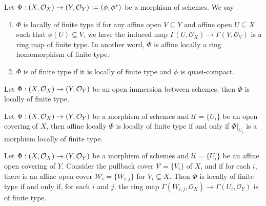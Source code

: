 \begin{definition}
Let $\Phi : \left(X, \mathcal{O}_{X}\right) \to \left(Y, \mathcal{O}_{Y}\right) := (\phi, \phi^*)$ be a morphism of schemes. We say
\begin{enumerate}
    \item $\Phi$ is locally of finite type if for any affine open $V \subseteq Y$ and affine open $U \subseteq X$ such that $\phi(U) \subseteq V$, we have the induced map $\Gamma(U, \mathscr{O}_X) \to \Gamma(V, \mathscr{O}_V)$ is a ring map of finite type. In another word, $\Phi$ is affine locally a ring homomorphism of finite type.
    \item $\Phi$ is of finite type if it is locally of finite type and $\phi$ is quasi-compact.
\end{enumerate}
\end{definition}

\begin{proposition}\label{thm:affine-locally-open-immersion}
  Let $\Phi : \left(X, \mathcal{O}_{X}\right) \to \left(Y, \mathcal{O}_{Y}\right)$ be an open immersion between schemes, then $\Phi$ is locally of finite type.
\end{proposition}

\begin{proposition}\label{thm:affine-locally-source-cover}
  Let $\Phi : \left(X, \mathcal{O}_{X}\right) \to \left(Y, \mathcal{O}_{Y}\right)$ be a morphism of schemes and $\mathscr{U} = \{U_{i}\}$ be an open covering of $X$, then affine locally $\Phi$ is locally of finite type if and only if $\Phi|_{U_i}$ is a morphism locally of finite type.
\end{proposition}

\begin{proposition}\label{thm:affine-cover-locally-of-finite-type}
  Let $\Phi : \left(X, \mathcal{O}_{X}\right) \to \left(Y, \mathcal{O}_{Y}\right)$ be a morphism of schemes and $\mathscr{U}=\{U_{i}\}$ be an affine open covering of $Y$. Consider the pullback cover $\mathscr{V} = \{V_{i}\}$ of $X$, and if for each $i$, there is
  an affine open cover $\mathscr{W}_{i} = \{W_{i, j}\}$ for $V_{i} \subseteq X$. Then $\Phi$ is locally of finite type if and only if, for each $i$ and $j$, the ring map
  $\Gamma(W_{i, j}, \mathscr{O}_{X}) \to \Gamma(U_{i}, \mathscr{O}_{Y})$ is of finite type.
\end{proposition}

